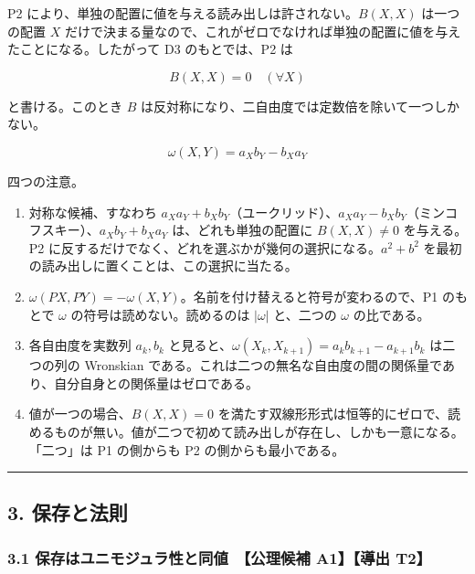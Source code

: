 \documentclass[
  a4paper,
]{ltjsarticle}
\begin{document}
P2 により、単独の配置に値を与える読み出しは許されない。\(B(X,X)\)
は一つの配置 \(X\)
だけで決まる量なので、これがゼロでなければ単独の配置に値を与えたことになる。したがって
D3 のもとでは、P2 は

\[
B(X,X)=0\quad(\forall X)
\]

と書ける。このとき \(B\)
は反対称になり、二自由度では定数倍を除いて一つしかない。

\[
\boxed{\;\omega(X,Y)=a_Xb_Y-b_Xa_Y\;}
\]

四つの注意。

\begin{enumerate}
\def\labelenumi{(\roman{enumi})}
\item
  対称な候補、すなわち
  \(a_Xa_Y+b_Xb_Y\)（ユークリッド）、\(a_Xa_Y-b_Xb_Y\)（ミンコフスキー）、\(a_Xb_Y+b_Xa_Y\)
  は、どれも単独の配置に \(B(X,X)\neq0\) を与える。P2
  に反するだけでなく、どれを選ぶかが幾何の選択になる。\(a^2+b^2\)
  を最初の読み出しに置くことは、この選択に当たる。
\item
  \(\omega(PX,PY)=-\omega(X,Y)\)。名前を付け替えると符号が変わるので、P1
  のもとで \(\omega\) の符号は読めない。読めるのは \(|\omega|\)
  と、二つの \(\omega\) の比である。
\item
  各自由度を実数列 \(a_k,b_k\)
  と見ると、\(\omega(X_k,X_{k+1})=a_kb_{k+1}-a_{k+1}b_k\) は二つの列の
  Wronskian
  である。これは二つの無名な自由度の間の関係量であり、自分自身との関係量はゼロである。
\item
  値が一つの場合、\(B(X,X)=0\)
  を満たす双線形形式は恒等的にゼロで、読めるものが無い。値が二つで初めて読み出しが存在し、しかも一意になる。「二つ」は
  P1 の側からも P2 の側からも最小である。
\end{enumerate}

\begin{center}\rule{0.5\linewidth}{0.5pt}\end{center}

\subsection{3. 保存と法則}\label{ux4fddux5b58ux3068ux6cd5ux5247}

\subsubsection{3.1 保存はユニモジュラ性と同値　【公理候補 A1】【導出
T2】}\label{ux4fddux5b58ux306fux30e6ux30cbux30e2ux30b8ux30e5ux30e9ux6027ux3068ux540cux5024-ux516cux7406ux5019ux88dc-a1ux5c0eux51fa-t2}
\end{document}
